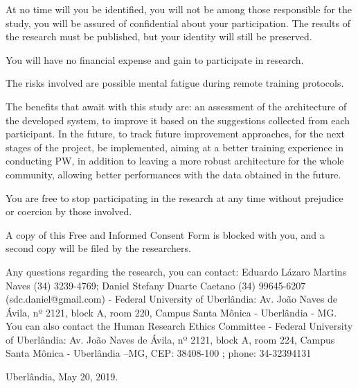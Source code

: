 At no time will you be identified, you will not be among those responsible for the study, you will be assured of confidential about your participation. The results of the research must be published, but your identity will still be preserved.

You will have no financial expense and gain to participate in research.

The risks involved are possible mental fatigue during remote training protocols.

The benefits that await with this study are: an assessment of the architecture of the developed system, to improve it based on the suggestions collected from each participant. In the future, to track future improvement approaches, for the next stages of the project, be implemented, aiming at a better training experience in conducting PW, in addition to leaving a more robust architecture for the whole community, allowing better performances with the data obtained in the future.

You are free to stop participating in the research at any time without prejudice or coercion by those involved.

A copy of this Free and Informed Consent Form is blocked with you, and a second copy will be filed by the researchers.

Any questions regarding the research, you can contact: Eduardo Lázaro Martins Naves (34) 3239-4769; Daniel Stefany Duarte Caetano (34) 99645-6207 (sdc.daniel@gmail.com) - Federal University of Uberlândia: Av. João Naves de Ávila, nº 2121, block A, room 220, Campus Santa Mônica - Uberlândia - MG. You can also contact the Human Research Ethics Committee - Federal University of Uberlândia: Av. João Naves de Ávila, nº 2121, block A, room 224, Campus Santa Mônica - Uberlândia –MG, CEP: 38408-100 ; phone: 34-32394131


\vspace{\baselineskip}

\vspace{\baselineskip}

\vspace{\baselineskip}

\vspace{\baselineskip}

\begin{center}
Uberlândia, May 20, 2019.
\end{center}

\vspace{\baselineskip}

